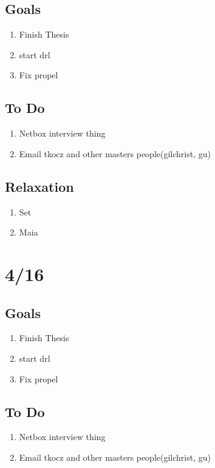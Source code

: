 \documentclass[11pt]{article}
\theoremstyle{remark}
\begin{document}
\subsection{Goals}

\begin{enumerate}
	\item Finish Thesis
	\item start drl
	\item Fix propel
\end{enumerate}

\subsection{To Do}

\begin{enumerate}
	\item Netbox interview thing
	\item Email tkocz and other masters people(gilchrist, gu)
\end{enumerate}

\subsection{Relaxation}

\begin{enumerate}
	\item Set
	\item Maia
\end{enumerate}

\section{4/16}

\subsection{Goals}

\begin{enumerate}
	\item Finish Thesis
	\item start drl
	\item Fix propel
\end{enumerate}

\subsection{To Do}

\begin{enumerate}
	\item Netbox interview thing
	\item Email tkocz and other masters people(gilchrist, gu)
\end{enumerate}
\end{document}
